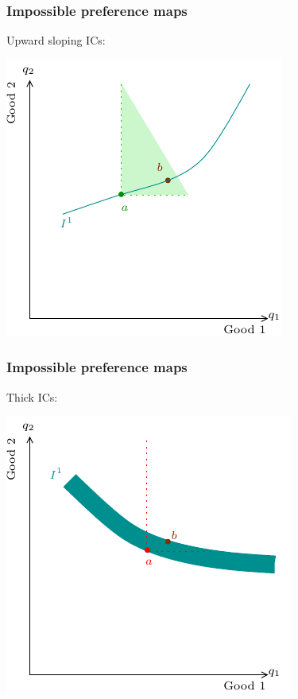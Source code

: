 \documentclass[xcolor=pdftex,dvipsnames]{beamer}
\begin{document}
\begin{frame}
\frametitle{Impossible preference maps} 
Upward sloping ICs:
\begin{center}
\includegraphics[scale=0.8]{pics/UpwardIC}
\end{center}


\end{frame}
\begin{frame}
\frametitle{Impossible preference maps} 
Thick ICs:
\begin{center}
\includegraphics[scale=0.8]{pics/ThickIC}
\end{center}


\end{frame}
\end{document}
